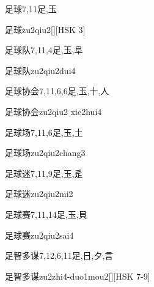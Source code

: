 \begin{Entry}{足球}{7,11}{⾜,⽟}
  \begin{Phonetics}{足球}{zu2qiu2}[][HSK 3]
  \end{Phonetics}
\end{Entry}

\begin{Entry}{足球队}{7,11,4}{⾜,⽟,⾩}
  \begin{Phonetics}{足球队}{zu2qiu2dui4}
  \end{Phonetics}
\end{Entry}

\begin{Entry}{足球协会}{7,11,6,6}{⾜,⽟,⼗,⼈}
  \begin{Phonetics}{足球协会}{zu2qiu2 xie2hui4}
  \end{Phonetics}
\end{Entry}

\begin{Entry}{足球场}{7,11,6}{⾜,⽟,⼟}
  \begin{Phonetics}{足球场}{zu2qiu2chang3}
  \end{Phonetics}
\end{Entry}

\begin{Entry}{足球迷}{7,11,9}{⾜,⽟,⾡}
  \begin{Phonetics}{足球迷}{zu2qiu2mi2}
  \end{Phonetics}
\end{Entry}

\begin{Entry}{足球赛}{7,11,14}{⾜,⽟,⾙}
  \begin{Phonetics}{足球赛}{zu2qiu2sai4}
  \end{Phonetics}
\end{Entry}

\begin{Entry}{足智多谋}{7,12,6,11}{⾜,⽇,⼣,⾔}
  \begin{Phonetics}{足智多谋}{zu2zhi4-duo1mou2}[][HSK 7-9]
  \end{Phonetics}
\end{Entry}

